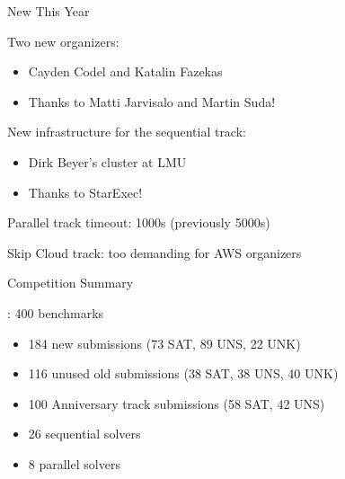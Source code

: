 \documentclass{beamer}
\begin{document}
\begin{frame}{New This Year}

\large

Two new organizers:
\begin{itemize}
\item Cayden Codel and Katalin Fazekas
\item Thanks to Matti Jarvisalo and Martin Suda!
\end{itemize}

\bigskip
\bigskip
\pause

New infrastructure for the sequential track:
\begin{itemize}
\item Dirk Beyer's cluster at LMU
\item Thanks to StarExec!
\end{itemize}

\bigskip
\bigskip
\pause

Parallel track timeout: 1000s (previously 5000s)

\bigskip

Skip Cloud track: too demanding for AWS organizers

\end{frame}

\begin{frame}{Competition Summary}

\large

: 400 benchmarks
\begin{itemize}
  \item 184 new submissions (73 SAT, 89 UNS, 22 UNK)
  \item 116 unused old submissions (38 SAT, 38 UNS, 40 UNK)
  \item 100 Anniversary track submissions (58 SAT, 42 UNS)
  \item 26 sequential solvers
  \item 8 parallel solvers
\end{itemize}

\end{frame}
\end{document}
